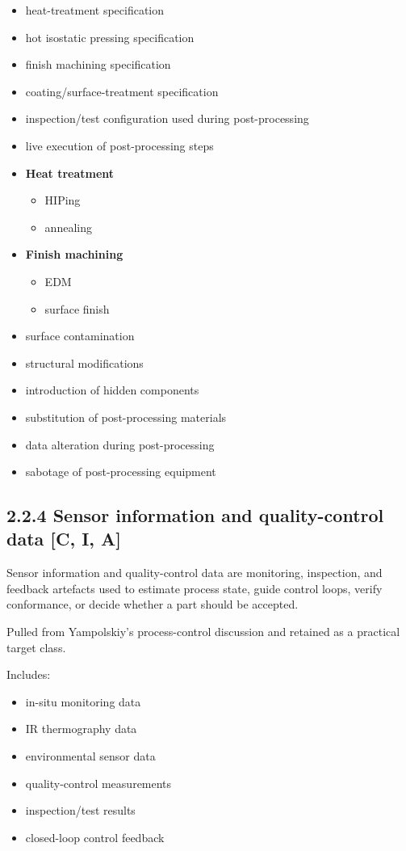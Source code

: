 \documentclass[10pt,a4paper,oneside]{report}
\begin{document}
\begin{itemize}
\item heat-treatment specification
\item hot isostatic pressing specification
\item finish machining specification
\item coating/surface-treatment specification
\item inspection/test configuration used during post-processing
\item live execution of post-processing steps
\item \textbf{Heat treatment}
\begin{itemize}
\item HIPing
\item annealing
\end{itemize}
\item \textbf{Finish machining}
\begin{itemize}
\item EDM
\item surface finish
\end{itemize}
\item surface contamination
\item structural modifications
\item introduction of hidden components
\item substitution of post-processing materials
\item data alteration during post-processing
\item sabotage of post-processing equipment
\end{itemize}


\subsection{2.2.4 Sensor information and quality-control data [C, I, A]}


Sensor information and quality-control data are monitoring, inspection, and feedback artefacts used to estimate process state, guide control loops, verify conformance, or decide whether a part should be accepted.

Pulled from Yampolskiy's process-control discussion and retained as a practical target class.

Includes:

\begin{itemize}
\item in-situ monitoring data
\item IR thermography data
\item environmental sensor data
\item quality-control measurements
\item inspection/test results
\item closed-loop control feedback
\end{itemize}
\end{document}
